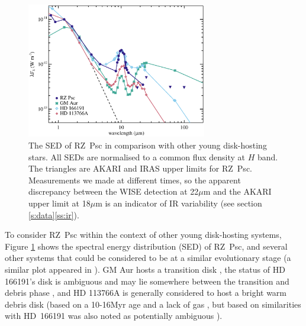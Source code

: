 \documentclass[]{rsos}
\begin{document}
\begin{figure}
  \begin{center}
    \hspace{-0.5cm} \includegraphics[width=0.7\textwidth]{figs/spcomp.eps}
    \caption{The SED of RZ~Psc in comparison with other young disk-hosting stars. All
      SEDs are normalised to a common flux density at $H$ band. The triangles are AKARI
      and IRAS upper limits for RZ~Psc. Measurements we made at different times, so the
      apparent discrepancy between the WISE detection at 22$\mu$m and the AKARI upper
      limit at 18$\mu$m is an indicator of IR variability (see section
      \ref{s:data}\ref{ss:ir}).}\label{fig:spcomp}
  \end{center}
\end{figure}

To consider RZ~Psc within the context of other young disk-hosting systems, Figure
\ref{fig:spcomp} shows the spectral energy distribution (SED) of RZ~Psc, and several
other systems that could be considered to be at a similar evolutionary stage (a similar
plot appeared in \cite{2014MNRAS.438.3299K}). GM Aur hosts a transition disk
\cite{2005ApJ...630L.185C}, the status of HD 166191's disk is ambiguous and may lie
somewhere between the transition and debris phase
\cite{2013ApJ...777...78S,2014MNRAS.438.3299K}, and HD 113766A is generally considered to
host a bright warm debris disk (based on a 10-16Myr age and a lack of gas
\cite{2006ApJS..166..351C}, but based on similarities with HD~166191 was also noted as
potentially ambiguous \cite{2014MNRAS.438.3299K}).
\end{document}
